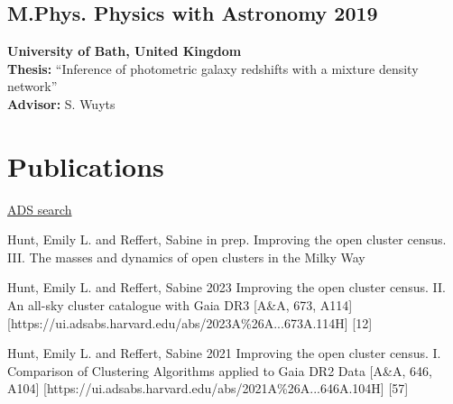 \documentclass[12pt, letterpaper]{hunt-cv}
\begin{document}
\subsection*{M.Phys. Physics with Astronomy \hfill 2019}
\begin{addmargin}[1em]{0em}
    \textbf{University of Bath, United Kingdom}\\
    \textbf{Thesis:} ``Inference of photometric galaxy redshifts with a
    mixture density network''\\
    \textbf{Advisor:} S. Wuyts
\end{addmargin}




\section*{Publications}

\href{\cvADSLink}{ADS search \faLink}


\begin{etaremune}
    \item \publication
        {Hunt, Emily L. and Reffert, Sabine}
        {in prep.}
        {Improving the open cluster census. III. The masses and dynamics of open clusters in the Milky Way}
    \item \publication
        {Hunt, Emily L. and Reffert, Sabine}
        {2023}
        {Improving the open cluster census. II. An all-sky cluster catalogue with Gaia DR3}
        [A\&A, 673, A114]
        [https://ui.adsabs.harvard.edu/abs/2023A\%26A...673A.114H]
        [12]
    \item \publication
        {Hunt, Emily L. and Reffert, Sabine}
        {2021}
        {Improving the open cluster census. I. Comparison of Clustering Algorithms applied to Gaia DR2 Data}
        [A\&A, 646, A104]
        [https://ui.adsabs.harvard.edu/abs/2021A\%26A...646A.104H]
        [57]
\end{etaremune}
\end{document}
